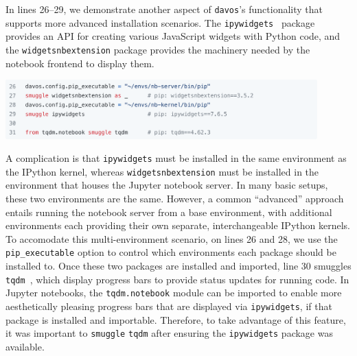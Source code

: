 \documentclass[preprint,12pt,a4paper]{elsarticle}
\begin{document}
In lines 26--29, we demonstrate another aspect of \texttt{davos}'s
functionality that supports more advanced installation scenarios.  The
\texttt{ipywidgets}~\cite{FredEtal15} package provides an API for
creating various JavaScript widgets with Python code, and the \texttt{widgetsnbextension} package provides
the machinery needed by the notebook frontend to display them.
\begin{center}
\includegraphics[width=0.9\textwidth]{figs/example6}
\end{center}
A complication is that \texttt{ipywidgets} must be installed in the
same environment as the IPython kernel, whereas
\texttt{widgetsnbextension} must be installed in the environment that
houses the Jupyter notebook server. In many basic setups, these two
environments are the same.  However, a common ``advanced'' approach
entails running the notebook server from a base environment, with
additional environments each providing their own separate,
interchangeable IPython kernels.  To accomodate this multi-environment
scenario, on lines 26 and 28, we use the \texttt{pip\_executable} option to control which environments each
package should be installed to.  Once these two packages are installed
and imported, line 30 smuggles \texttt{tqdm}~\cite{daCoEtal22}, which
display progress bars to provide status updates for running code. In
Jupyter notebooks, the \texttt{tqdm.notebook} module can be imported
to enable more aesthetically pleasing progress bars that are displayed via
\texttt{ipywidgets}, if that package is installed and
importable. Therefore, to take advantage of this feature, it was
important to \texttt{smuggle} \texttt{tqdm} after ensuring the
\texttt{ipywidgets} package was available.
\end{document}
